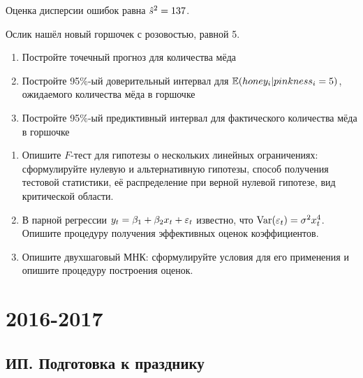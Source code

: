 \documentclass[12pt, a4paper]{article}\usepackage[]{graphicx}\usepackage[]{color}
\begin{document}
\begin{enumerate}
Оценка дисперсии ошибок равна $\hat{s}^2 = 137$.

Ослик нашёл новый горшочек с розовостью, равной 5.

\begin{enumerate}
\item Постройте точечный прогноз для количества мёда
\item Постройте 95\%-ый доверительный интервал для $\mathbb{E}(honey_i | pinkness_i = 5)$, ожидаемого количества мёда в горшочке
\item Постройте 95\%-ый предиктивный интервал для фактического количества мёда в горшочке
\end{enumerate}


\end{enumerate}

\begin{enumerate}[resume]
\item Опишите $F$-тест для гипотезы о нескольких линейных ограничениях: сформулируйте нулевую и альтернативную гипотезы, способ получения тестовой статистики, её распределение при верной нулевой гипотезе, вид критической области.

\item В парной регрессии $y_t=\beta_1+ \beta_2 x_t+\varepsilon_t$ известно, что $\operatorname{Var}(\varepsilon_t) = \sigma^2 x_t^4$. Опишите процедуру получения эффективных оценок коэффициентов.

\item Опишите двухшаговый МНК: сформулируйте условия для его применения и опишите процедуру построения оценок.

\end{enumerate}

\section{2016-2017}

\subsection{ИП. Подготовка к празднику}
\end{document}
